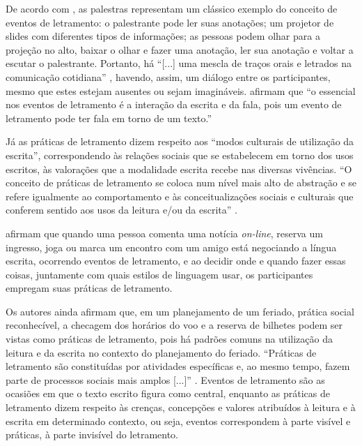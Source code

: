 \documentclass{textolivre}
\begin{document}
De acordo com \textcite{street2014}, as palestras representam um clássico
exemplo do conceito de eventos de letramento: o palestrante pode ler suas
anotações; um projetor de slides com diferentes tipos de informações; as
pessoas podem olhar para a projeção no alto, baixar o olhar e fazer uma
anotação, ler sua anotação e voltar a escutar o palestrante. Portanto, há
“[...] uma mescla de traços orais e letrados na comunicação cotidiana” \cite[p. 146]{street2014},
havendo, assim, um diálogo entre os participantes, mesmo que
estes estejam ausentes ou sejam imagináveis. \textcite[p. 25]{barton2015} afirmam
que “o essencial nos eventos de letramento é a interação da escrita e da fala,
pois um evento de letramento pode ter fala em torno de um texto.”

Já as práticas de letramento dizem respeito aos “modos culturais de utilização
da escrita”, correspondendo às relações sociais que se estabelecem em torno dos
usos escritos, às valorações que a modalidade escrita recebe nas diversas
vivências. “O conceito de práticas de letramento se coloca num nível mais alto
de abstração e se refere igualmente ao comportamento e às conceitualizações
sociais e culturais que conferem sentido aos usos da leitura e/ou da escrita”
\cite[p. 18]{street2014}.

\textcite{barton2015} afirmam que quando uma pessoa comenta uma notícia
\textit{on-line}, reserva um ingresso, joga ou marca um encontro com um amigo está
negociando a língua escrita, ocorrendo eventos de letramento, e ao decidir onde
e quando fazer essas coisas, juntamente com quais estilos de linguagem usar, os
participantes empregam suas práticas de letramento.

Os autores ainda afirmam que, em um planejamento de um feriado, prática social
reconhecível, a checagem dos horários do voo e a reserva de bilhetes podem ser
vistas como práticas de letramento, pois há padrões comuns na utilização da
leitura e da escrita no contexto do planejamento do feriado. “Práticas de
letramento são constituídas por atividades específicas e, ao mesmo tempo, fazem
parte de processos sociais mais amplos [...]” \cite[p. 40]{barton2015}.
Eventos de letramento são as ocasiões em que o texto escrito figura como
central, enquanto as práticas de letramento dizem respeito às crenças,
concepções e valores atribuídos à leitura e à escrita em determinado contexto,
ou seja, eventos correspondem à parte visível e práticas, à parte invisível do
letramento.
\end{document}
